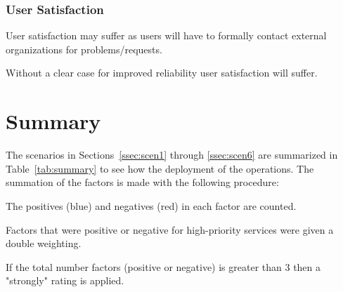 \documentclass[12pt,a4paper]{article}
\begin{document}
\subsubsection*{User Satisfaction}
\bitm
\item User satisfaction may suffer as \EC users will have to formally contact external organizations for problems/requests.
  \item Without a clear case for improved reliability user satisfaction will suffer.
\eitm

\section{Summary}
\label{sec:summ}

The scenarios in Sections~\ref{ssec:scen1} through \ref{ssec:scen6} are summarized in Table~\ref{tab:summary} to see how the deployment of the \ED operations. 
The summation of the factors is made with the following procedure:
\bitm
\item The positives (blue) and negatives (red) in each factor are counted.
\item Factors that were positive or negative for high-priority services were given a double weighting.
\item If the total number factors (positive or negative) is greater than 3 then a "strongly" rating is applied.
\eitm
\newlength{\colwid}
\setlength{\colwid}{1.45cm}
\newcommand{\facc}{0.45}
\newcommand{\faccc}{0.3}
\newlength{\pdd}
\setlength{\pdd}{3pt}
\end{document}
